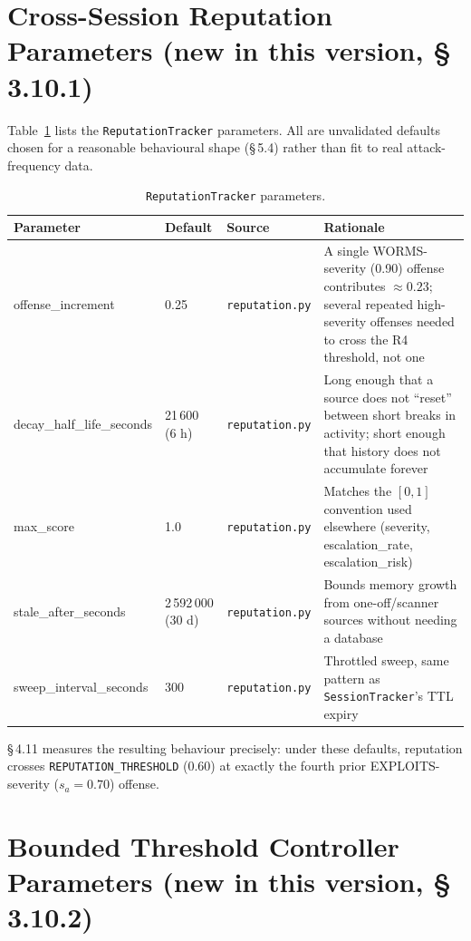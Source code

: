 \section{Cross-Session Reputation Parameters (new in this version, \S\,3.10.1)}

Table~\ref{tab:reputation_params} lists the \texttt{ReputationTracker}
parameters. All are unvalidated defaults chosen for a reasonable
behavioural shape (\S\,5.4) rather than fit to real attack-frequency data.

\begin{table}[ht]
  \centering
  \caption{\texttt{ReputationTracker} parameters.}
  \label{tab:reputation_params}
  \begin{tabular}{p{2.8cm}p{3.6cm}p{2.3cm}p{6.0cm}}
    \toprule
    Parameter & Default & Source & Rationale \\
    \midrule
    offense\_increment & 0.25 & \texttt{reputation.py} & A single WORMS-severity (0.90) offense contributes $\approx 0.23$; several repeated high-severity offenses needed to cross the R4 threshold, not one \\
    decay\_half\_life\_seconds & 21\,600 (6 h) & \texttt{reputation.py} & Long enough that a source does not ``reset'' between short breaks in activity; short enough that history does not accumulate forever \\
    max\_score & 1.0 & \texttt{reputation.py} & Matches the $[0,1]$ convention used elsewhere (severity, escalation\_rate, escalation\_risk) \\
    stale\_after\_seconds & 2\,592\,000 (30 d) & \texttt{reputation.py} & Bounds memory growth from one-off/scanner sources without needing a database \\
    sweep\_interval\_seconds & 300 & \texttt{reputation.py} & Throttled sweep, same pattern as \texttt{SessionTracker}'s TTL expiry \\
    \bottomrule
  \end{tabular}
\end{table}

\S\,4.11 measures the resulting behaviour precisely: under these defaults,
reputation crosses \texttt{REPUTATION\_THRESHOLD} (0.60) at exactly the
fourth prior EXPLOITS-severity ($s_a=0.70$) offense.

\section{Bounded Threshold Controller Parameters (new in this version, \S\,3.10.2)}

